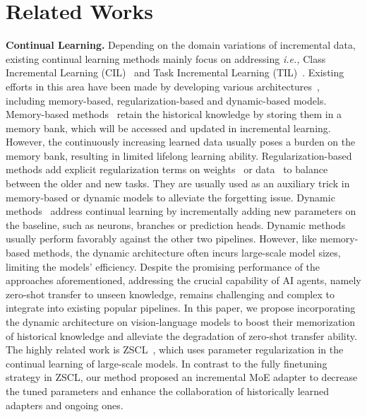 \section{Related Works}
\label{sec:Related Works}
\textbf{Continual Learning.}
Depending on the domain variations of incremental data, existing continual learning methods mainly focus on addressing \textit{i.e.,} Class Incremental Learning (CIL)~\cite{de2023effectiveness, jodelet2023class, belouadah2019il2m, yan2021dynamically, liu2023class} and Task Incremental Learning (TIL)~\cite{oren2021defense, mallya2018packnet, zheng2023preventing}. %
Existing efforts in this area have been made by developing various architectures~\cite{de2021continual}, including memory-based, regularization-based and dynamic-based models.  
Memory-based methods~\cite{shin2017continual, lopez2017gradient, prabhu2020gdumb, lavda2018continual, ostapenko2022continual, rebuffi2017icarl, isele2018selective} retain the historical knowledge by storing them in a memory bank, which will be accessed and updated in incremental learning. However, the continuously increasing learned data usually poses a burden on the memory bank, resulting in limited lifelong learning ability. 
Regularization-based methods add explicit regularization terms on weights~\cite{aljundi2018memory, kirkpatrick2017overcoming, lee2017overcoming, zenke2017continual} or data~\cite{dhar2019learning, douillard2020podnet, hou2019learning, li2017learning} to balance between the older and new tasks. They are usually used as an auxiliary trick in memory-based or dynamic models to alleviate the forgetting issue.
Dynamic methods~\cite{douillard2022dytox, hu2023dense, ye2023self, yan2021dynamically, yoon2017lifelong, aljundi2017expert} address continual learning by incrementally adding new parameters on the baseline, such as neurons, branches or prediction heads. Dynamic methods usually perform favorably against the other two pipelines. However, like memory-based methods, the dynamic architecture often incurs large-scale model sizes, limiting the models' efficiency.
Despite the promising performance of the approaches aforementioned, addressing the crucial capability of AI agents, namely zero-shot transfer to unseen knowledge, remains challenging and complex to integrate into existing popular pipelines. In this paper, we propose incorporating the dynamic architecture on vision-language models to boost their memorization of historical knowledge and alleviate the degradation of zero-shot transfer ability.        
The highly related work is ZSCL~\cite{zheng2023preventing}, which uses parameter regularization in the continual learning of large-scale models. In contrast to the fully finetuning strategy in ZSCL, our method proposed an incremental MoE adapter to decrease the tuned parameters and enhance the collaboration of historically learned adapters and ongoing ones. 





